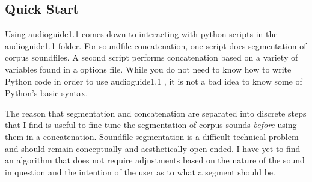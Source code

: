 \documentclass{article}
\newcommand{\ag}{audioguide1.1 }
\begin{document}
\begin{spacing}{1.2}
  


\section{Quick Start}
Using \ag comes down to interacting with python scripts in the \ag folder.  For soundfile concatenation, one script does segmentation of corpus soundfiles.  A second script performs concatenation based on a variety of variables found in a options file.  While you do not need to know how to write Python code in order to use \ag, it is not a bad idea to know some of Python's basic syntax.

The reason that segmentation and concatenation are separated into discrete steps that I find is useful to fine-tune the segmentation of corpus sounds \emph{before} using them in a concatenation.  Soundfile segmentation is a difficult technical problem and should remain conceptually and aesthetically open-ended.  I have yet to find an algorithm that does not require adjustments based on the nature of the sound in question and the intention of the user as to what a segment should be.


\end{spacing}
\end{document}
